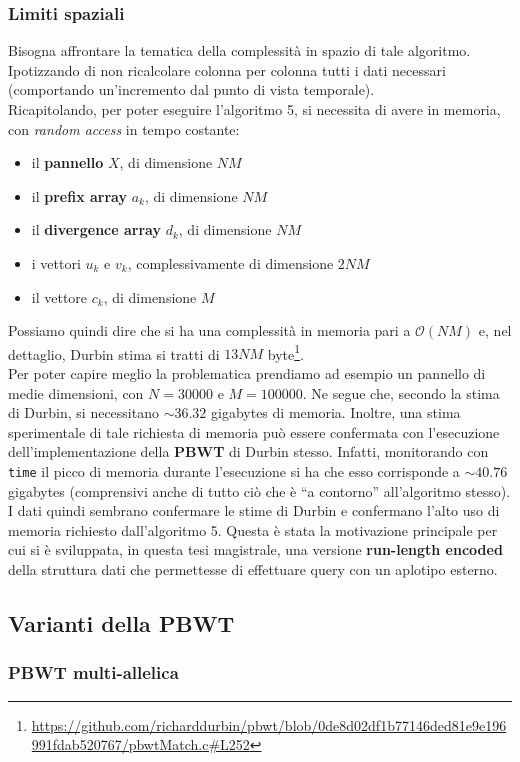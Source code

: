 \subsubsection{Limiti spaziali}
Bisogna affrontare la tematica della complessità in spazio di tale
algoritmo. Ipotizzando di non ricalcolare colonna per colonna tutti i dati
necessari (comportando un'incremento dal punto di vista temporale).\\
Ricapitolando, per poter eseguire l'algoritmo 5, si necessita di avere in
memoria, con \textit{random access} in tempo costante:
\begin{itemize}
  \item il \textbf{pannello} $X$, di dimensione $NM$
  \item il \textbf{prefix array} $a_k$, di dimensione $NM$
  \item il \textbf{divergence array} $d_k$, di dimensione $NM$
  \item i vettori $u_k$ e $v_k$, complessivamente di dimensione $2NM$
  \item il vettore $c_k$, di dimensione $M$
\end{itemize}
Possiamo quindi dire che si ha una complessità in memoria pari a
$\mathcal{O}(NM)$ e, nel dettaglio, Durbin stima si tratti di $13NM$
byte\footnote{\url{https://github.com/richarddurbin/pbwt/blob/0de8d02df1b77146ded81e9e196991fdab520767/pbwtMatch.c\#L252}}.\\
Per poter capire meglio la problematica prendiamo ad esempio un pannello di
medie dimensioni, con $N=30000$ e $M=100000$. Ne segue che, secondo la stima di
Durbin, si necessitano $\sim 36.32$ gigabytes di memoria. Inoltre, una stima
sperimentale di tale richiesta di memoria può essere confermata con l'esecuzione
dell'implementazione della \textbf{PBWT} di Durbin stesso. Infatti, monitorando
con \texttt{time} il picco di memoria durante l'esecuzione si ha che esso
corrisponde a $\sim 40.76$ gigabytes (comprensivi anche di tutto ciò che è ``a
contorno'' all'algoritmo stesso). I dati quindi sembrano confermare le stime di
Durbin e confermano l'alto uso di memoria richiesto dall'algoritmo 5. Questa è
stata la motivazione principale per cui si è sviluppata, in questa tesi
magistrale, una versione \textbf{run-length encoded} della struttura dati che
permettesse di effettuare query con un aplotipo esterno.
\subsection{Varianti della PBWT}
\subsubsection{PBWT multi-allelica}
